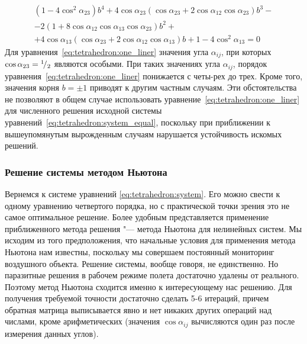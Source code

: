\documentclass[../main.tex]{subfiles}
\begin{document}
%
%
\begin{equation} \label{eq:tetrahedron:one_liner}
\begin{array}{l}
(1-4 \cos^2 \alpha_{23}) b^4 + 4 \cos \alpha_{23} (\cos \alpha_{23} + 2 \cos \alpha_{12} \cos \alpha_{23} ) b^3 - \\
- 2 (1 + 8 \cos \alpha_{12} \cos \alpha_{13} \cos \alpha_{23}) b^2 +
\\+ 4 \cos \alpha_{13} (\cos \alpha_{23} + 2 \cos \alpha_{12} \cos \alpha_{13}) b + 1-4 \cos^2 \alpha_{13} =0
\end{array}
\end{equation}
Для уравнения~\eqref{eq:tetrahedron:one_liner} значения угла $\alpha_{ij}$, при которых $\cos\alpha_{23} = {}^{1}\!/_{2}$ являются особыми. При таких значениях угла $\alpha_{ij}$, порядок уравнения~\eqref{eq:tetrahedron:one_liner} понижается с четы-рех до трех. Кроме того, значения корня $b = \pm 1$ приводят к другим частным случаям. Эти обстоятельства не позволяют в общем случае использовать уравнение~\eqref{eq:tetrahedron:one_liner} для численного решения исходной системы уравнений~\eqref{eq:tetrahedron:system_equal}, поскольку при приближении к вышеупомянутым вырожденным случаям нарушается устойчивость искомых решений.

\subsubsection{Решение системы методом Ньютона}
Вернемся к системе уравнений \eqref{eq:tetrahedron:system}. Его можно свести к одному уравнению четвертого порядка, но с практической точки зрения это не самое оптимальное решение. Более удобным представляется применение приближенного метода решения "--- метода Ньютона для нелинейных систем. Мы исходим из того предположения, что начальные условия для применения метода Ньютона нам известны, поскольку мы совершаем постоянный мониторинг воздушного объекта. Решение системы, вообще говоря, не единственно. Но паразитные решения в рабочем режиме полета достаточно удалены от реального. Поэтому метод Ньютона сходится именно к интересующему нас решению. Для получения требуемой точности достаточно сделать 5-6 итераций, причем обратная матрица выписывается явно и нет никаких других операций над числами, кроме арифметических (значения $\cos\alpha_{ij}$ вычисляются один раз после измерения данных углов).
\end{document}
